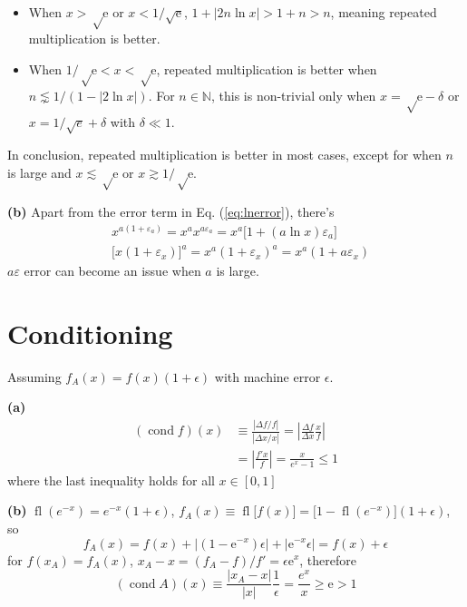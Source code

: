 \documentclass[11pt]{article}
\numberwithin{equation}{section} %
\newcommand\e{\mathrm{e}}
\DeclareMathOperator{\fl}{fl}
\DeclareMathOperator{\cond}{cond}
\begin{document}
\begin{itemize}
  \item When $x > \sqrt \e$ or $x< 1/\sqrt{\e}$,
    $1+|2n \ln x| > 1+n > n$,
    meaning repeated multiplication is better. 
  \item When $1/\sqrt \e < x < \sqrt \e$,
    repeated multiplication is better when $n \lnsim 1/(1-|2\ln x|)$. 
    For $n\in\mathbb N$, this is non-trivial only when 
    $x = \sqrt\e - \delta$ or $x = 1/\sqrt{e} + \delta$
    with $\delta \ll 1$. 
\end{itemize}
In conclusion, repeated multiplication is better in most cases, except for 
when $n$ is large and $x\lesssim \sqrt \e$ or $x\gtrsim 1/\sqrt \e$. 

\textbf{(b)} Apart from the error term in Eq. (\ref{eq:lnerror}), there's
\begin{align}
  & x^{a(1+\varepsilon_a)} = x^a x^{a\varepsilon_a} 
  = x^a \big[1 + (a\ln x)\varepsilon_a\big] \\
  & \big[x(1+\varepsilon_x)\big]^a = x^a(1+\varepsilon_x)^a 
  = x^a (1+a\varepsilon_x)
\end{align}
$a\varepsilon$ error can become an issue when $a$ is large. 

\section{Conditioning}
Assuming $ f_A(x) = f(x)(1+\epsilon)$
with machine error $\epsilon$. 

\textbf{(a)} 
\begin{align}
  (\cond f)(x) &\equiv \frac{|\Delta f / f|}{|\Delta x / x|} 
               = \left|\frac{\Delta f}{\Delta x}\frac{x}{f}\right| \\
               &= \left|\frac{f' x}{f} \right| = \frac{x}{e^x-1} \le 1
\end{align}
where the last inequality holds for all $x\in [0,1]$

\textbf{(b)} $\fl(e^{-x}) = e^{-x}(1+\epsilon)$, 
$f_A(x) \equiv \fl\big[f(x)\big] = \big[1 - \fl(e^{-x})\big](1+\epsilon)$, 
so 
\begin{equation}
  f_A(x) = f(x) + |(1-\e^{-x})\epsilon| + |\e^{-x}\epsilon| 
  = f(x) + \epsilon
\end{equation}
for $f(x_A) = f_A(x)$, $x_A-x = (f_A - f)/ f' = \epsilon \e^{x}$, therefore 
\begin{equation}
  (\cond A)(x) \equiv \frac{|x_A - x|}{|x|}\frac{1}{\epsilon} 
  = \frac{e^x}{x} \ge \e > 1
\end{equation}
\end{document}
